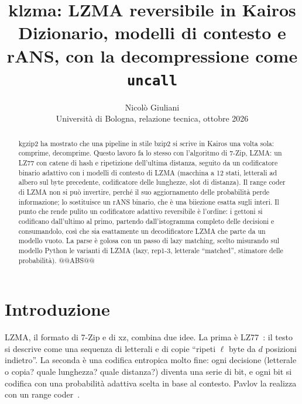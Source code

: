 
\title{\textbf{klzma: LZMA reversibile in Kairos}\\[4pt]
\large Dizionario, modelli di contesto e rANS, con la decompressione come \texttt{uncall}}
\author{Nicolò Giuliani\\[2pt]\small Università di Bologna, relazione tecnica, ottobre 2026}
\date{}


\maketitle

\begin{abstract}
kgzip2 ha mostrato che una pipeline in stile bzip2 si scrive in Kairos una volta sola:  comprime,  decomprime. Questo lavoro fa lo stesso con l'algoritmo di 7-Zip, LZMA: un LZ77 con catene di hash e ripetizione dell'ultima distanza, seguito da un codificatore binario adattivo con i modelli di contesto di LZMA (macchina a 12 stati, letterali ad albero sul byte precedente, codificatore delle lunghezze, slot di distanza). Il range coder di LZMA non si può invertire, perché il suo aggiornamento delle probabilità perde informazione; lo sostituisce un rANS binario, che è una biiezione esatta sugli interi. Il punto che rende pulito un codificatore adattivo reversibile è l'ordine: i gettoni si codificano dall'ultimo al primo, partendo dall'istogramma completo delle decisioni e consumandolo, così che  sia esattamente un decodificatore LZMA che parte da un modello vuoto. La parse è golosa con un passo di lazy matching, scelto misurando sul modello Python le varianti di LZMA (lazy, rep1-3, letterale ``matched'', stimatore delle probabilità). @@ABS@@
\end{abstract}

\section{Introduzione}

LZMA, il formato di 7-Zip e di xz, combina due idee. La prima è LZ77~\cite{lz77}: il testo si descrive come una sequenza di letterali e di copie ``ripeti $\ell$ byte da $d$ posizioni indietro''. La seconda è una codifica entropica molto fine: ogni decisione (letterale o copia? quale lunghezza? quale distanza?) diventa una serie di bit, e ogni bit si codifica con una probabilità adattiva scelta in base al contesto. Pavlov la realizza con un range coder~\cite{lzmasdk}.

